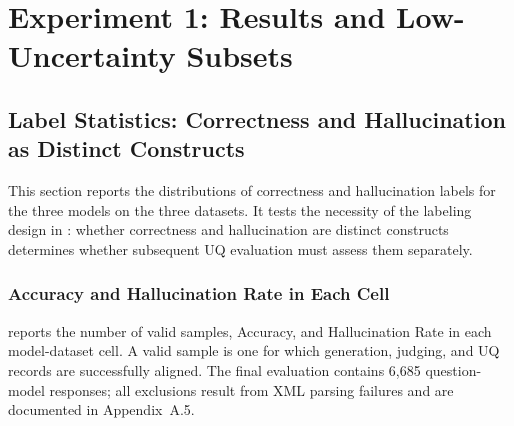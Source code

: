 \clearpage
\section{Experiment 1: Results and Low-Uncertainty Subsets}
\label{sec:experiment1_results}

\subsection{Label Statistics: Correctness and Hallucination as Distinct Constructs}
\label{subsec:label_statistics}

This section reports the distributions of correctness and hallucination labels for the three models on the three datasets. It tests the necessity of the labeling design in : whether correctness and hallucination are distinct constructs determines whether subsequent UQ evaluation must assess them separately.

\subsubsection{Accuracy and Hallucination Rate in Each Cell}

 reports the number of valid samples, Accuracy, and Hallucination Rate in each model-dataset cell. A valid sample is one for which generation, judging, and UQ records are successfully aligned. The final evaluation contains 6,685 question-model responses; all exclusions result from XML parsing failures and are documented in Appendix~A.5.

